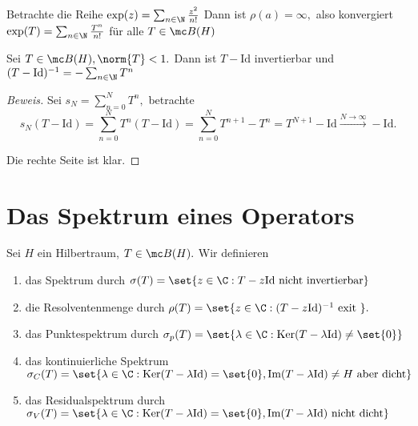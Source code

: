 \begin{ex} Betrachte die Reihe $\exp(z) = \sum_{n \in \N} \frac{z^2}{n!}$ Dann ist $\rho(a) = \infty,$ also konvergiert $\exp(T) = \sum_{n\in \N} \frac{T^n}{n!}$ für alle $T \in \mc B(H)$
	
\end{ex}


\begin{theorem} Sei $T \in \mc B(H), \norm{T} < 1.$ Dann ist $T - \text{Id}$ invertierbar und $(T- \text{Id})^{-1} = -\sum_{n \in \N} T^n$
	
	
	\begin{proof}[Beweis] Sei $s_N = \sum_{n = 0}^N T^n,$ betrachte \[ s_N(T- \text{Id}) = \sum_{n = 0}^N T^n (T- \text{Id}) = \sum_{n = 0}^N T^{n+1} - T^n = T^{N+1}- \text{Id} \xrightarrow{N \to \infty} - \text{Id}.\]
		
		
		Die rechte Seite ist klar. 
		
	\end{proof}
	
\end{theorem}


\section{Das Spektrum eines Operators}

\begin{definition} Sei $H$ ein Hilbertraum, $T \in \mc B(H).$ Wir definieren
	
	\begin{enumerate}
		
		\item das Spektrum durch $\sigma(T) = \set{z \in \C: T-z \text{Id nicht invertierbar}}$
		
		\item die Resolventenmenge durch $\rho(T) = \set{z \in \C: (T-z \text{Id})^{-1} \text{ exit }}.$
		
		\item das Punktespektrum durch $\sigma_p(T) = \set{\lambda \in \C: \text{Ker}(T-\lambda\text{Id}) \not= \set{0}}$
		
		\item das kontinuierliche Spektrum $\sigma_C(T) = \set{\lambda \in \C: \text{Ker}(T-\lambda \text{Id})=\set{0}, \text{Im}(T- \lambda \text{Id}) \neq H \text{ aber dicht}}$
		
		\item das Residualspektrum durch $\sigma_V(T) = \set{\lambda \in \C: \text{Ker}(T- \lambda \text{Id}) = \set{0}, \text{Im}(T- \lambda \text{Id}) \text{ nicht dicht}}$
		
	\end{enumerate}
	
\end{definition}


